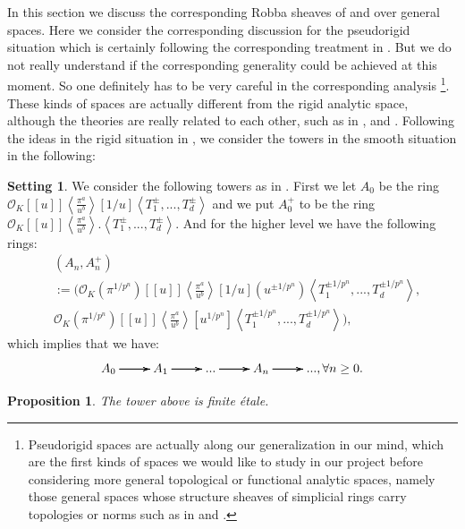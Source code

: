 \documentclass[11pt]{book}
\newtheorem{proposition}[theorem]{Proposition}
\theoremstyle{definition}
\numberwithin{equation}{section}
\newtheorem{setting}[theorem]{Setting}
\begin{document}
\indent In this section we discuss the corresponding Robba sheaves of \cite{12KL1} and \cite{12KL2} over general spaces. Here we consider the corresponding discussion for the pseudorigid situation which is certainly following the corresponding treatment in \cite[Chapter 8]{12KL2}. But we do not really understand if the corresponding generality could be achieved at this moment. So one definitely has to be very careful in the corresponding analysis \footnote{Pseudorigid spaces are actually along our generalization in our mind, which are the first kinds of spaces we would like to study in our project before considering more general topological or functional analytic spaces, namely those general spaces whose structure sheaves of simplicial rings carry topologies or norms such as in \cite{12BBBK} and \cite{12CS2}.}. These kinds of spaces are actually different from the rigid analytic space, although the theories are really related to each other, such as in \cite{12Bel1}, \cite{12Bel2} and \cite{12L}. Following the ideas in the rigid situation in \cite{12KL2}, we consider the towers in the smooth situation in the following:


\begin{setting}
We consider the following towers as in \cite[Chapter 5]{12KL2}. First we let $A_0$ be the ring $\mathcal{O}_K[[u]]\left<\frac{\pi^a}{u^b}\right>[1/u]\left<T_1^\pm,...,T_d^\pm\right>$ and we put $A_0^+$ to be the ring\\ $\mathcal{O}_K[[u]]\left<\frac{\pi^a}{u^b}\right>.\left<T_1^\pm,...,T_d^\pm\right>$. And for the higher level we have the following rings:
\begin{align}
&(A_n,A_n^+)\\
&:=(\mathcal{O}_K(\pi^{1/p^n})[[u]]\left<\frac{\pi^a}{u^b}\right>[1/u](u^{\pm 1/p^n})\left<T_1^{\pm 1/p^n},...,T_d^{\pm 1/p^n}\right>,\\
&\mathcal{O}_K(\pi^{1/p^n})[[u]]\left<\frac{\pi^a}{u^b}\right>[u^{1/p^n}]\left<T_1^{\pm 1/p^n},...,T_d^{\pm 1/p^n}\right>),
\end{align}
which implies that we have:
\[
\xymatrix@C+0pc@R+0pc{
A_0\ar[r] \ar[r] \ar[r] &A_1 \ar[r] \ar[r] \ar[r] &... \ar[r] \ar[r] \ar[r] &A_n \ar[r] \ar[r] \ar[r] &..., \forall n\geq 0. 
}
\]
\end{setting}


\begin{proposition}
The tower above is finite \'etale.	
\end{proposition}
\end{document}
